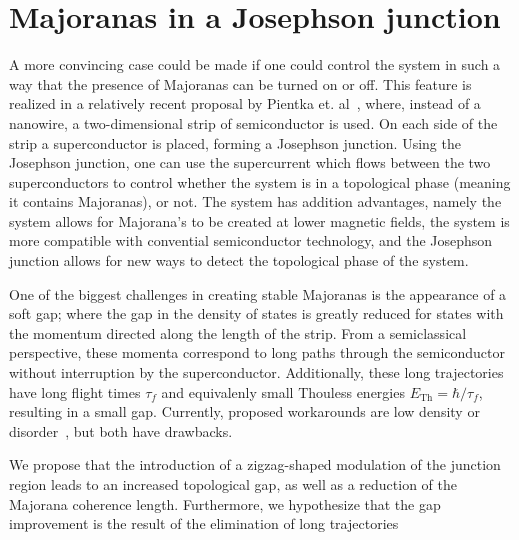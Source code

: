 \section{Majoranas in a Josephson junction}
	A more convincing case could be made if one could control the system in such a way that the presence of Majoranas can be turned on or off.
	This feature is realized in a relatively recent proposal by Pientka et. al~\cite{pientka_topological_2017}, where, instead of a nanowire, a two-dimensional strip of semiconductor is used.
	On each side of the strip a superconductor is placed, forming a Josephson junction.
	Using the Josephson junction, one can use the supercurrent which flows between the two superconductors to control whether the system is in a topological phase (meaning it contains Majoranas), or not.
	The system has addition advantages, namely the system allows for Majorana's to be created at lower magnetic fields, the system is more compatible with convential semiconductor technology, and the Josephson junction allows for new ways to detect the topological phase of the system.


	One of the biggest challenges in creating stable Majoranas is the appearance of a soft gap; where the gap in the density of states is greatly reduced for states with the momentum directed along the length of the strip.
	From a semiclassical perspective, these momenta correspond to long paths through the semiconductor without interruption by the superconductor.
	Additionally, these long trajectories have long flight times $\tau_f$ and equivalenly small Thouless energies $E_{\textrm{Th}}=\hbar / \tau_f$, resulting in a small gap. 
	Currently, proposed workarounds are low density or disorder~\cite{haim_double-edge_2018}, but both have drawbacks.


	We propose that the introduction of a zigzag-shaped modulation of the junction region leads to an increased topological gap, as well as a reduction of the Majorana coherence length.
	Furthermore, we hypothesize that the gap improvement is the result of the elimination of long trajectories